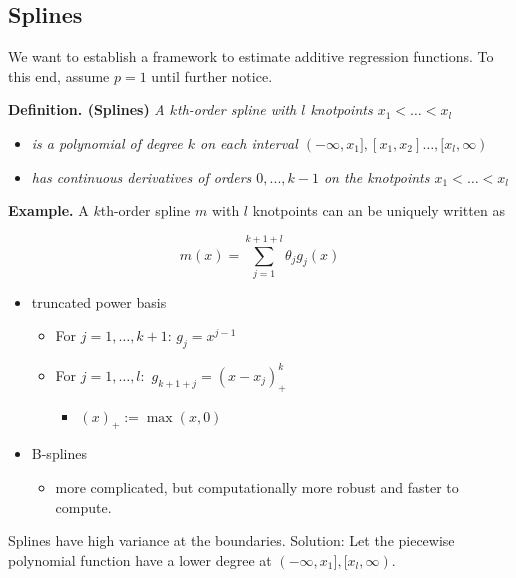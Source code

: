 \documentclass[
]{book}
\providecommand{\tightlist}{%
  \setlength{\itemsep}{0pt}\setlength{\parskip}{0pt}}
\begin{document}
\hypertarget{splines}{%
\subsection{Splines}\label{splines}}

We want to establish a framework to estimate additive regression functions. To this end, assume \(p=1\) until further notice.

\textbf{Definition. (Splines)} \emph{A \(k\)th-order spline with \(l\) knotpoints \(x_1 <\dots<x_l\)}

\begin{itemize}
\tightlist
\item
  \emph{is a polynomial of degree \(k\) on each interval \((-\infty,x_1],[x_1,x_2]\dots,[x_l,\infty)\)}
\item
  \emph{has continuous derivatives of orders \(0,...,k-1\) on the knotpoints \(x_1 <\dots<x_l\)}
\end{itemize}

\textbf{Example.} A \(k\)th-order spline \(m\) with \(l\) knotpoints can an be uniquely written as

\[
m(x)=\sum_{j=1}^{k+1+l}\theta_jg_j(x)
\]

\begin{itemize}
\tightlist
\item
  truncated power basis

  \begin{itemize}
  \tightlist
  \item
    For \(j=1,\dots, k+1\): \(g_{j}=x^{j-1}\)
  \item
    For \(j=1,\dots,l:\) \(g_{k+1+j}=(x-x_j)^k_+\)

    \begin{itemize}
    \tightlist
    \item
      \((x)_+:= \max(x,0)\)
    \end{itemize}
  \end{itemize}
\item
  B-splines

  \begin{itemize}
  \tightlist
  \item
    more complicated, but computationally more robust and faster to compute.
  \end{itemize}
\end{itemize}

Splines have high variance at the boundaries. Solution: Let the piecewise polynomial function have a lower degree at \((-\infty,x_1],[x_l,\infty)\).
\end{document}
